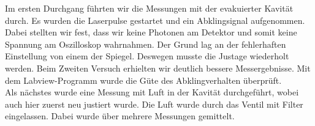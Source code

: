 Im ersten Durchgang führten wir die Messungen mit der evakuierter Kavität durch. Es wurden die Laserpulse gestartet und ein Abklingsignal aufgenommen. Dabei stellten wir fest, dass wir keine Photonen am Detektor und somit keine Spannung am Oszilloskop wahrnahmen. Der Grund lag an der fehlerhaften Einstellung von einem der Spiegel. Deswegen musste die Justage wiederholt werden. Beim Zweiten Versuch erhielten wir deutlich bessere Messergebnisse. Mit dem Labview-Programm wurde die Güte des Abklingverhalten überprüft.\\ 
Als nächstes wurde eine Messung mit Luft in der Kavität durchgeführt, wobei auch hier zuerst neu justiert wurde. Die Luft wurde durch das Ventil mit Filter eingelassen. Dabei wurde über mehrere Messungen gemittelt.